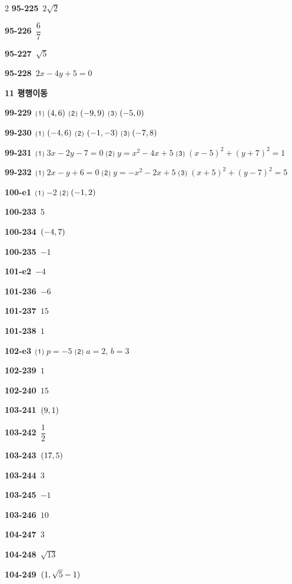 \documentclass[10pt,a4paper]{article}
\begin{document}
\begin{multicols}{2}
\noindent\textbf{95-225}\ $2\sqrt{2}$\par
\noindent\textbf{95-226}\ $\dfrac{6}{7}$\par
\noindent\textbf{95-227}\ $\sqrt{5}$\par
\noindent\textbf{95-228}\ $2x-4y+5=0$\par
\noindent\textbf{11 평행이동}\par\smallskip
\noindent\textbf{99-229}\ ⑴ $(4{,}\mkern3mu\mathopen{}6)$ ⑵ $(-9{,}\mkern3mu\mathopen{}9)$ ⑶ $(-5{,}\mkern3mu\mathopen{}0)$\par
\noindent\textbf{99-230}\ ⑴ $(-4{,}\mkern3mu\mathopen{}6)$ ⑵ $(-1{,}\mkern3mu\mathopen{}-3)$ ⑶ $(-7{,}\mkern3mu\mathopen{}8)$\par
\noindent\textbf{99-231}\ ⑴ $3x-2y-7=0$ ⑵ $y=x^2-4x+5$ ⑶ $(x-5)^2+(y+7)^2=1$\par
\noindent\textbf{99-232}\ ⑴ $2x-y+6=0$ ⑵ $y=-x^2-2x+5$ ⑶ $(x+5)^2+(y-7)^2=5$\par
\noindent\textbf{100-e1}\ ⑴ $-2$ ⑵ $(-1{,}\mkern3mu\mathopen{}2)$\par
\noindent\textbf{100-233}\ $5$\par
\noindent\textbf{100-234}\ $(-4{,}\mkern3mu\mathopen{}7)$\par
\noindent\textbf{100-235}\ $-1$\par
\noindent\textbf{101-e2}\ $-4$\par
\noindent\textbf{101-236}\ $-6$\par
\noindent\textbf{101-237}\ $15$\par
\noindent\textbf{101-238}\ $1$\par
\noindent\textbf{102-e3}\ ⑴ $p=-5$ ⑵ $a=2$, $b=3$\par
\noindent\textbf{102-239}\ $1$\par
\noindent\textbf{102-240}\ $15$\par
\noindent\textbf{103-241}\ $(9{,}\mkern3mu\mathopen{}1)$\par
\noindent\textbf{103-242}\ $\dfrac{1}{2}$\par
\noindent\textbf{103-243}\ $(17{,}\mkern3mu\mathopen{}5)$\par
\noindent\textbf{103-244}\ $3$\par
\noindent\textbf{103-245}\ $-1$\par
\noindent\textbf{103-246}\ $10$\par
\noindent\textbf{104-247}\ $3$\par
\noindent\textbf{104-248}\ $\sqrt{13}$\par
\noindent\textbf{104-249}\ $(1{,}\mkern3mu\mathopen{}\sqrt{5}-1)$\par

\end{multicols}
\end{document}
